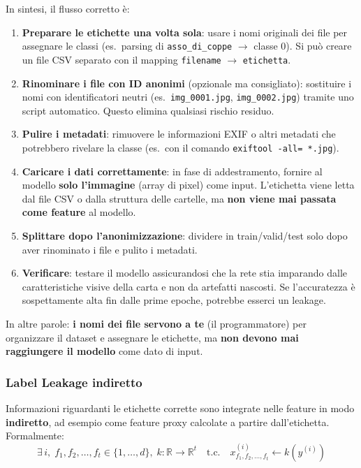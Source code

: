 \documentclass[a4paper,12pt]{article}
\begin{document}
\begin{attenzione}[title=Chiarimento importante: nomi dei file ed etichette]
In sintesi, il flusso corretto è:
\begin{enumerate}[noitemsep]
    \item \textbf{Preparare le etichette una volta sola}: usare i nomi originali dei file per assegnare le classi (es.\ parsing di \texttt{asso\_di\_coppe} $\rightarrow$ classe 0). Si può creare un file CSV separato con il mapping \texttt{filename} $\rightarrow$ \texttt{etichetta}.
    \item \textbf{Rinominare i file con ID anonimi} (opzionale ma consigliato): sostituire i nomi con identificatori neutri (es.\ \texttt{img\_0001.jpg}, \texttt{img\_0002.jpg}) tramite uno script automatico. Questo elimina qualsiasi rischio residuo.
    \item \textbf{Pulire i metadati}: rimuovere le informazioni EXIF o altri metadati che potrebbero rivelare la classe (es.\ con il comando \texttt{exiftool -all= *.jpg}).
    \item \textbf{Caricare i dati correttamente}: in fase di addestramento, fornire al modello \textbf{solo l'immagine} (array di pixel) come input. L'etichetta viene letta dal file CSV o dalla struttura delle cartelle, ma \textbf{non viene mai passata come feature} al modello.
    \item \textbf{Splittare dopo l'anonimizzazione}: dividere in train/valid/test solo dopo aver rinominato i file e pulito i metadati.
    \item \textbf{Verificare}: testare il modello assicurandosi che la rete stia imparando dalle caratteristiche visive della carta e non da artefatti nascosti. Se l'accuratezza è sospettamente alta fin dalle prime epoche, potrebbe esserci un leakage.
\end{enumerate}

In altre parole: \textbf{i nomi dei file servono a te} (il programmatore) per organizzare il dataset e assegnare le etichette, ma \textbf{non devono mai raggiungere il modello} come dato di input.
\end{attenzione}

\subsubsection{Label Leakage indiretto}

Informazioni riguardanti le etichette corrette sono integrate nelle feature in modo \textbf{indiretto}, ad esempio come feature proxy calcolate a partire dall'etichetta. Formalmente:
$$\exists\, i,\; f_1, f_2, \ldots, f_t \in \{1,\ldots,d\},\; k: \mathbb{R} \to \mathbb{R}^t \quad \text{t.c.} \quad x_{f_1,f_2,\ldots,f_t}^{(i)} \leftarrow k(y^{(i)})$$
\end{document}
